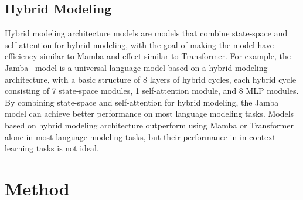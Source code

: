 \documentclass{article}
\theoremstyle{plain}
\theoremstyle{definition}
\theoremstyle{remark}
\begin{document}
\subsection{Hybrid Modeling}
Hybrid modeling architecture models are models that combine state-space and self-attention for hybrid modeling, with the goal of making the model have efficiency similar to Mamba and effect similar to Transformer. For example, the Jamba~\cite{lieber2024jamba} model is a universal language model based on a hybrid modeling architecture, with a basic structure of 8 layers of hybrid cycles, each hybrid cycle consisting of 7 state-space modules, 1 self-attention module, and 8 MLP modules. By combining state-space and self-attention for hybrid modeling, the Jamba model can achieve better performance on most language modeling tasks. Models based on hybrid modeling architecture outperform using Mamba or Transformer alone in most language modeling tasks, but their performance in in-context learning tasks is not ideal.


\section{Method}
\end{document}
